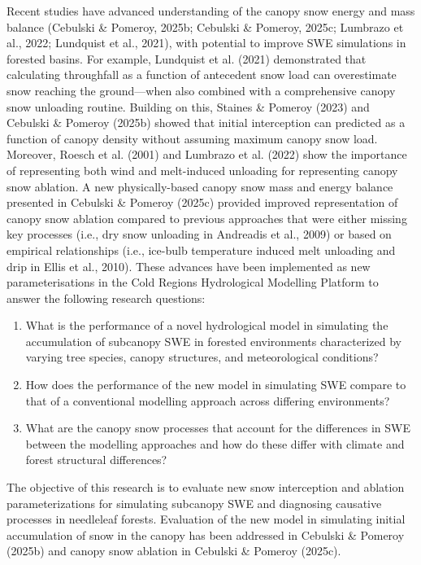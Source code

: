 \documentclass[
  letterpaper,
]{tex/uofsthesis-cs}
\providecommand{\tightlist}{%
  \setlength{\itemsep}{0pt}\setlength{\parskip}{0pt}}
\begin{document}
Recent studies have advanced understanding of the canopy snow energy and
mass balance (Cebulski \& Pomeroy, 2025b; Cebulski \& Pomeroy, 2025c;
Lumbrazo et al., 2022; Lundquist et al., 2021), with potential to
improve SWE simulations in forested basins. For example, Lundquist et
al. (2021) demonstrated that calculating throughfall as a function of
antecedent snow load can overestimate snow reaching the ground---when
also combined with a comprehensive canopy snow unloading routine.
Building on this, Staines \& Pomeroy (2023) and Cebulski \& Pomeroy
(2025b) showed that initial interception can predicted as a function of
canopy density without assuming maximum canopy snow load. Moreover,
Roesch et al. (2001) and Lumbrazo et al. (2022) show the importance of
representing both wind and melt-induced unloading for representing
canopy snow ablation. A new physically-based canopy snow mass and energy
balance presented in Cebulski \& Pomeroy (2025c) provided improved
representation of canopy snow ablation compared to previous approaches
that were either missing key processes (i.e., dry snow unloading in
Andreadis et al., 2009) or based on empirical relationships (i.e.,
ice-bulb temperature induced melt unloading and drip in Ellis et al.,
2010). These advances have been implemented as new parameterisations in
the Cold Regions Hydrological Modelling Platform to answer the following
research questions:

\begin{enumerate}
\def\labelenumi{\arabic{enumi}.}
\tightlist
\item
  What is the performance of a novel hydrological model in simulating
  the accumulation of subcanopy SWE in forested environments
  characterized by varying tree species, canopy structures, and
  meteorological conditions?
\item
  How does the performance of the new model in simulating SWE compare to
  that of a conventional modelling approach across differing
  environments?
\item
  What are the canopy snow processes that account for the differences in
  SWE between the modelling approaches and how do these differ with
  climate and forest structural differences?
\end{enumerate}

The objective of this research is to evaluate new snow interception and
ablation parameterizations for simulating subcanopy SWE and diagnosing
causative processes in needleleaf forests. Evaluation of the new model
in simulating initial accumulation of snow in the canopy has been
addressed in Cebulski \& Pomeroy (2025b) and canopy snow ablation in
Cebulski \& Pomeroy (2025c).
\end{document}
